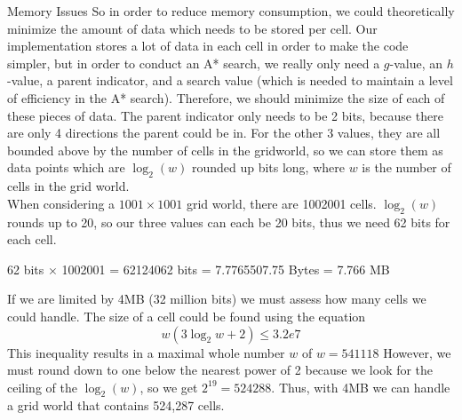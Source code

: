 \documentclass[12pt]{article}
\theoremstyle{definition}
\begin{document}
\begin{onehalfspacing}
\begin{section}{Memory Issues}
So in order to reduce memory consumption, we could theoretically minimize the amount of data which needs to be stored per cell. Our implementation stores a lot of data in each cell in order to make the code simpler, but in order to conduct an A* search, we really only need a $g$-value, an $h$-value, a parent indicator, and a search value (which is needed to maintain a level of efficiency in the A* search). Therefore, we should minimize the size of each of these pieces of data. The parent indicator only needs to be 2 bits, because there are only 4 directions the parent could be in. For the other 3 values, they are all bounded above by the number of cells in the gridworld, so we can store them as data points which are $\log_2(w)$ rounded up bits long, where $w$ is the number of cells in the grid world. \\[1em]
When considering a $1001\times 1001$ grid world, there are 1002001 cells. $\log_2(w)$ rounds up to 20, so our three values can each be 20 bits, thus we need 62 bits for each cell. 
\begin{center}
    62 bits $\times$ 1002001 = 62124062 bits = 7.7765507.75 Bytes = 7.766 MB 
\end{center}
If we are limited by 4MB (32 million bits) we must assess how many cells we could handle. The size of a cell could be found using the equation 
\begin{equation*}
    w(3\log_2{w} + 2) \leq 3.2e7
\end{equation*}
This inequality results in a maximal whole number $w$ of $w = 541118$ However, we must round down to one below the nearest power of 2 because we look for the ceiling of the $\log_2(w)$, so we get $2^{19}=524288$.
Thus, with 4MB we can handle a grid world that contains 524,287 cells.


\end{section}

\end{onehalfspacing}
\end{document}
